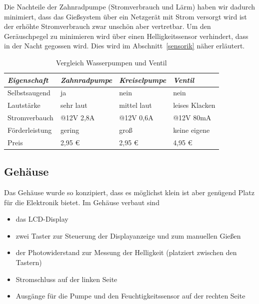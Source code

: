 ﻿\documentclass[]{IEEEtran}
\begin{document}
Die Nachteile der Zahnradpumpe (Stromverbrauch und Lärm) haben wir dadurch minimiert, dass das Gießsystem über ein Netzgerät mit Strom versorgt wird ist der erhöhte Stromverbrauch zwar unschön aber vertretbar. Um den Geräuschpegel zu minimieren wird über einen Helligkeitssensor verhindert, dass in der Nacht gegossen wird. Dies wird im Abschnitt~\ref{sensorik} näher erläutert.
	
\begin{table}[!t]
	\centering
	\onehalfspacing
	\footnotesize
	\caption{Vergleich Wasserpumpen und Ventil}
	\label{Vergleich zwischen Wasserpumpen und Ventil}
		\begin{tabular}{|l|lll|}
		\hline
		\textit{Eigenschaft} & \textit{Zahnradpumpe} & \textit{Kreiselpumpe} & \textit{Ventil} \\
		\hline
		Selbstsaugend	&ja	&nein &nein\\
		
		Lautstärke		&sehr laut	&mittel laut	&leises Klacken\\
		
		Stromverbauch	&@12V 2,8A	&@12V 0,6A	&@12V 80mA\\
		
		Förderleistung	&gering		&groß		&keine eigene\\
		
		Preis			&2,95 \euro	& 2,95 \euro	&	4,95 \euro\\
		\hline		
		\end{tabular}
		
\end{table}	
	
	
	
\subsection{Gehäuse}
	Das Gehäuse wurde so konzipiert, dass es möglichst klein ist aber genügend Platz für die Elektronik bietet.
	Im Gehäuse verbaut sind
\begin{itemize}
	\item das LCD-Display
	\item zwei Taster zur Steuerung der Displayanzeige und zum manuellen Gießen
	\item der Photowiderstand zur Messung der Helligkeit (platziert zwischen den Tastern)
	\item Stromschluss auf der linken Seite
	\item Ausgänge für die Pumpe und den Feuchtigkeitssensor auf der rechten Seite

\end{itemize}	
\end{document}
